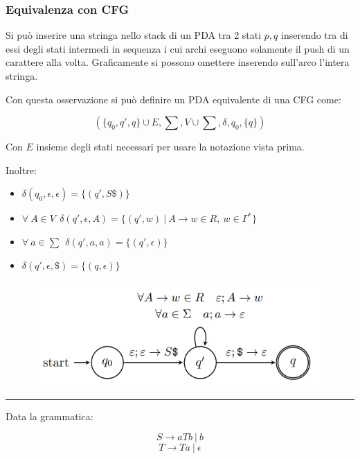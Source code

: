\documentclass{article}
\begin{document}
\subsubsection{Equivalenza con CFG}

Si può inserire una stringa nello stack di un PDA tra 2 stati $p,q$ inserendo tra di essi degli stati intermedi in sequenza i cui archi eseguono solamente il push di un carattere alla volta. Graficamente si possono omettere inserendo sull'arco l'intera stringa.\newline

\noindent Con questa osservazione si può definire un PDA equivalente di una CFG come:

$$(\{q_0,q',q\}\cup E,\sum,V\cup\sum,\delta,q_0,\{q\})$$

\noindent Con $E$ insieme degli stati necessari per usare la notazione vista prima.\newline

\noindent Inoltre:
\begin{itemize}
    \item $\delta(q_0,\epsilon,\epsilon)=\{(q',S\$)\}$
    \item $\forall\ A\in V\ \  \delta(q',\epsilon,A)=\{(q',w)\ |\ A\rightarrow w \in R,\ w\in \Gamma^*\}$
    \item $\forall\ a\in \sum\ \ \delta(q',a,a)=\{(q',\epsilon)\}$
    \item $\delta(q',\epsilon,\$)=\{(q,\epsilon)\} $
\end{itemize}

\begin{figure}[ht]
    \centering
    \includegraphics[width=0.7\linewidth]{CFGtoPDA.png}
    \label{fig:cfg2pda}
\end{figure}

\newpage

\noindent\rule{\textwidth}{0.5pt}\newline

\noindent Data la grammatica:

$$S\rightarrow aTb\ |\ b$$
$$T\rightarrow Ta\ |\ \epsilon$$
\end{document}
